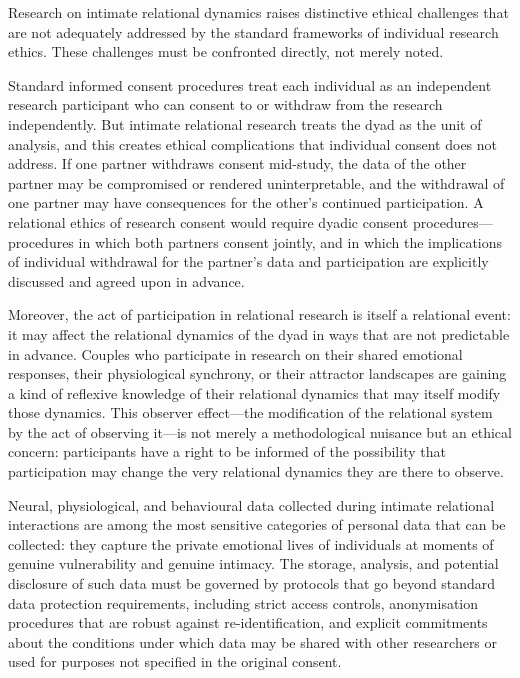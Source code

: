 \noindent
Research on intimate relational dynamics raises distinctive ethical challenges that are not adequately addressed by the standard frameworks of individual research ethics. These challenges must be confronted directly, not merely noted.

 Standard informed consent procedures treat each individual as an independent research participant who can consent to or withdraw from the research independently. But intimate relational research treats the dyad as the unit of analysis, and this creates ethical complications that individual consent does not address. If one partner withdraws consent mid-study, the data of the other partner may be compromised or rendered uninterpretable, and the withdrawal of one partner may have consequences for the other's continued participation. A relational ethics of research consent would require dyadic consent procedures---procedures in which both partners consent jointly, and in which the implications of individual withdrawal for the partner's data and participation are explicitly discussed and agreed upon in advance.

Moreover, the act of participation in relational research is itself a relational event: it may affect the relational dynamics of the dyad in ways that are not predictable in advance. Couples who participate in research on their shared emotional responses, their physiological synchrony, or their attractor landscapes are gaining a kind of reflexive knowledge of their relational dynamics that may itself modify those dynamics. This observer effect---the modification of the relational system by the act of observing it---is not merely a methodological nuisance but an ethical concern: participants have a right to be informed of the possibility that participation may change the very relational dynamics they are there to observe.

 Neural, physiological, and behavioural data collected during intimate relational interactions are among the most sensitive categories of personal data that can be collected: they capture the private emotional lives of individuals at moments of genuine vulnerability and genuine intimacy. The storage, analysis, and potential disclosure of such data must be governed by protocols that go beyond standard data protection requirements, including strict access controls, anonymisation procedures that are robust against re-identification, and explicit commitments about the conditions under which data may be shared with other researchers or used for purposes not specified in the original consent.

